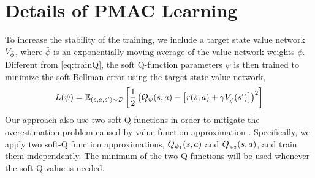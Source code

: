 \section{Details of PMAC Learning}
\label{sec:implementationPMAC}
To increase the stability of the training, we include a target state value network $V_{\bar{\phi}}$, where $\bar{\phi}$ is an exponentially moving average of the value network weights $\phi$. 
Different from \cref{eq:trainQ}, the soft Q-function parameters $\psi$ is then trained to minimize the soft Bellman error using the target state value network,
\begin{equation}
L(\psi) = \mathbb{E}_{(s,a,s') \sim {\mathcal{D}}} \left[ \frac{1}{2} \left( Q_{\psi}(s,a) - \left[r(s,a) + \gamma V_{\bar{\phi}}(s') \right] \right)^2 \right]
\end{equation}
Our approach also use two soft-Q functions in order to mitigate the overestimation problem caused by value function approximation \citep{haarnoja2018soft,fujimoto2018addressing}. Specifically, we apply two soft-Q function approximations, $Q_{\psi_1}(s,a)$ and $Q_{\psi_2}(s,a)$, and train them independently.  The minimum of the two Q-functions will be used whenever the soft-Q value is needed. 

